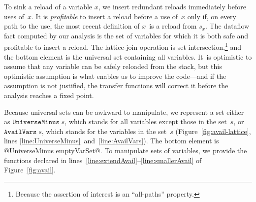 \documentclass[blockstyle,preprint,natbib,nocopyrightspace]{sigplanconf}
\newcommand\linepairref[2]{lines \ref{line:#1}~and~\ref{line:#2}}
\newcommand\linerangeref[2]{\mbox{lines~\ref{line:#1}--\ref{line:#2}}}
\newcommand\slotof[1]{\ensuremath{s_{#1}}}
\newcommand{\authornote}[1]{{\em #1}}
\def\authornote#1{\unskip\relax}
\newcommand{\simon}[1]{\authornote{SLPJ: #1}}
\newcommand\figref[1]{Figure~\ref{fig:#1}}
\begin{document}
To sink a reload of a variable $x$, we insert redundant reloads immediately
before uses of~$x$.
It is \emph{profitable} to insert a reload before a use of~$x$ only if, 
on every path to the use, the most recent definition of $x$~is a reload from
$\slotof x$.
\simon{I'm confused.  Surely that definition of profitable is also what we
mean by safe?  Also you italicise ``profitable'' but not ``safe'' which is confusing.}
The dataflow fact computed by our analysis is the set of variables for
which it is both 
safe and profitable to insert a reload.
The lattice-join operation is set intersection,\footnote
{Because the assertion of interest is an ``all-paths'' property.}
and the bottom element
is the universal set containing all variables.
It~is optimistic to assume that any variable can be safely reloaded from the stack,
but this optimistic assumption is what enables us to improve the
code---and if the assumption is not justified, the transfer functions
will correct it before
the analysis reaches a fixed point.
\simon{I'm guessing tha you intend this sentence to address my long bleat:
``I'm puzzled about why you are treating this example so differently
to constant-prop in Section 3.1.  It looks almost identical to me.  We could
keep a fact for every variable: $x=\bot$ means nothing is known; $x=s_x$ means
x's stack slot is up to date; $x=\top$ means x's stack slot is out of date.
Then keep a finite map as we do for constant prop.  If there is a difference
that drives the rep you have here, let's say so. If the difference is
purely accidental, we should eliminate it.  (Or maybe we don't have time, in
which case we should remark that there is no diff.)''.
For the paper, let's leave it as it is, but this note is to remind us
that I am still unhappy on this point.  I think the difficulty is that we
want to represent \emph{both} the universal set \emph{and} the empty set.
But I'm unclear about the trade-offs in approximation that arise 
from this either-or representation.}

\ifpagetuning\enlargethispage{\baselineskip}\fi

Because universal sets can be awkward to manipulate, we represent a
set either as
$\mathtt{UniverseMinus}\;s$, which stands for all variables except
those in the set~$s$,
or $\mathtt{AvailVars}\;s$, which stands for the variables in the set~$s$
(\figref{avail-lattice}, \linepairref{UniverseMinus}{AvailVars}).
%
%
The bottom element is @UniverseMinus emptyVarSet@.
To manipulate sets of variables, we provide the functions declared in
\linerangeref{extendAvail}{smallerAvail} of \figref{avail}.
\end{document}
